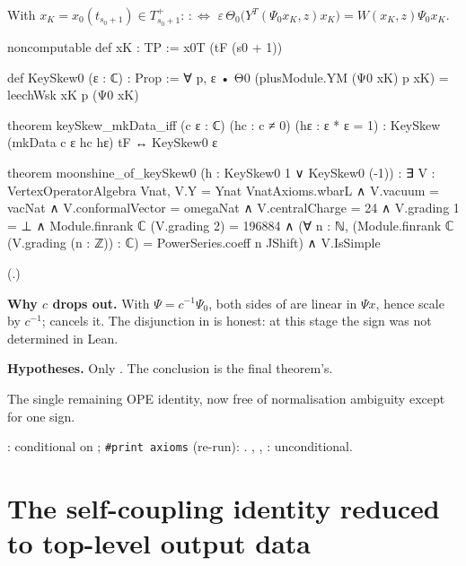 \begin{definition}\label{ch14:def:keyskew0}
With $x_K=x_0(t_{s_0+1})\in T_{s_0+1}^+$:
 $:\iff$ $\varepsilon\,\Theta_0\bigl(Y^T(\Psi_0x_K,z)x_K\bigr)=W(x_K,z)\Psi_0x_K$.
\end{definition}
\begin{leancode}
noncomputable def xK : TP := x0T (tF (s0 + 1))

def KeySkew0 (ε : ℂ) : Prop :=
  ∀ p, ε • Θ0 (plusModule.YM (Ψ0 xK) p xK) = leechWsk xK p (Ψ0 xK)

theorem keySkew_mkData_iff (c ε : ℂ) (hc : c ≠ 0) (hε : ε * ε = 1) :
    KeySkew (mkData c ε hc hε) tF ↔ KeySkew0 ε

theorem moonshine_of_keySkew0 (h : KeySkew0 1 ∨ KeySkew0 (-1)) :
    ∃ V : VertexOperatorAlgebra Vnat,
      V.Y = Ynat VnatAxioms.wbarL ∧ V.vacuum = vacNat ∧ V.conformalVector = omegaNat ∧
      V.centralCharge = 24 ∧
      V.grading 1 = ⊥ ∧
      Module.finrank ℂ (V.grading 2) = 196884 ∧
      (∀ n : ℕ, (Module.finrank ℂ (V.grading (n : ℤ)) : ℂ) = PowerSeries.coeff n JShift) ∧
      V.IsSimple
\end{leancode}
(.)

\begin{dictionary}
\textbf{Why $c$ drops out.}  With $\Psi=c^{-1}\Psi_0$, both sides of  are linear in
$\Psi x$, hence scale by $c^{-1}$;  cancels it.  The disjunction in
 is honest: at this stage the sign was not determined in Lean.

\textbf{Hypotheses.}  Only .  The conclusion is the final theorem's.
\end{dictionary}
\begin{physics}
The single remaining OPE identity, now free of normalisation ambiguity except for one sign.
\end{physics}


\begin{status}
: conditional on ; \texttt{\#print axioms}
(re-run): .  , ,
: unconditional.
\end{status}

\section{The self-coupling identity reduced to top-level output data}\label{ch14:sec:keyskew}

